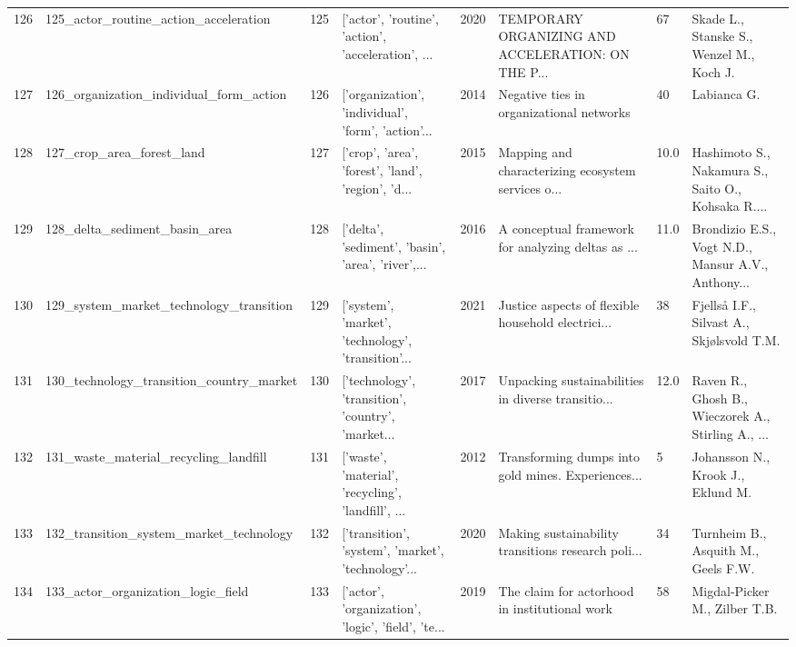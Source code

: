\begin{tabular}{rlrlrlll}
        126 &              125\_actor\_routine\_action\_acceleration &       125 & ['actor', 'routine', 'action', 'acceleration', ... &          2020 & TEMPORARY ORGANIZING AND ACCELERATION: ON THE P... &      67 &           Skade L., Stanske S., Wenzel M., Koch J. \\
        127 &            126\_organization\_individual\_form\_action &       126 & ['organization', 'individual', 'form', 'action'... &          2014 &           Negative ties in organizational networks &      40 &                                        Labianca G. \\
        128 &                          127\_crop\_area\_forest\_land &       127 & ['crop', 'area', 'forest', 'land', 'region', 'd... &          2015 & Mapping and characterizing ecosystem services o... &    10.0 & Hashimoto S., Nakamura S., Saito O., Kohsaka R.... \\
        129 &                      128\_delta\_sediment\_basin\_area &       128 & ['delta', 'sediment', 'basin', 'area', 'river',... &          2016 & A conceptual framework for analyzing deltas as ... &    11.0 & Brondizio E.S., Vogt N.D., Mansur A.V., Anthony... \\
        130 &            129\_system\_market\_technology\_transition &       129 & ['system', 'market', 'technology', 'transition'... &          2021 & Justice aspects of flexible household electrici... &      38 &          Fjellså I.F., Silvast A., Skjølsvold T.M. \\
        131 &           130\_technology\_transition\_country\_market &       130 & ['technology', 'transition', 'country', 'market... &          2017 & Unpacking sustainabilities in diverse transitio... &    12.0 & Raven R., Ghosh B., Wieczorek A., Stirling A., ... \\
        132 &              131\_waste\_material\_recycling\_landfill &       131 & ['waste', 'material', 'recycling', 'landfill', ... &          2012 & Transforming dumps into gold mines. Experiences... &       5 &                  Johansson N., Krook J., Eklund M. \\
        133 &            132\_transition\_system\_market\_technology &       132 & ['transition', 'system', 'market', 'technology'... &          2020 & Making sustainability transitions research poli... &      34 &                Turnheim B., Asquith M., Geels F.W. \\
        134 &                 133\_actor\_organization\_logic\_field &       133 & ['actor', 'organization', 'logic', 'field', 'te... &          2019 &      The claim for actorhood in institutional work &      58 &                      Migdal-Picker M., Zilber T.B. \\

\end{tabular}
